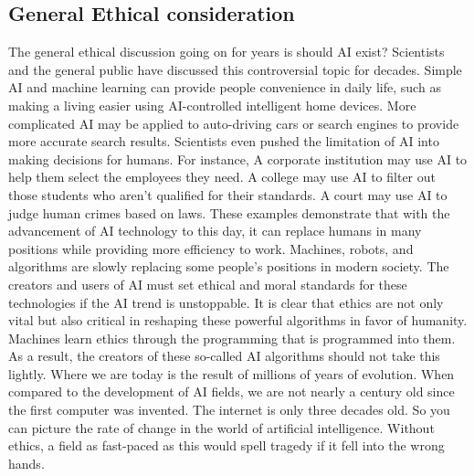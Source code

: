 \documentclass[10pt,twocolumn]{article}
\begin{document}
\subsection{General Ethical consideration}
    The general ethical discussion going on for years is should AI exist? Scientists and the general public have discussed this controversial topic for decades. Simple AI and machine learning can provide people convenience in daily life, such as making a living easier using AI-controlled intelligent home devices. More complicated AI may be applied to auto-driving cars or search engines to provide more accurate search results. Scientists even pushed the limitation of AI into making decisions for humans. For instance, A corporate institution may use AI to help them select the employees they need. A college may use AI to filter out those students who aren't qualified for their standards. A court may use AI to judge human crimes based on laws. These examples demonstrate that with the advancement of AI technology to this day, it can replace humans in many positions while providing more efficiency to work. Machines, robots, and algorithms are slowly replacing some people's positions in modern society. The creators and users of AI must set ethical and moral standards for these technologies if the AI trend is unstoppable\cite{EthicalIssue}. It is clear that ethics are not only vital but also critical in reshaping these powerful algorithms in favor of humanity. Machines learn ethics through the programming that is programmed into them. As a result, the creators of these so-called AI algorithms should not take this lightly. Where we are today is the result of millions of years of evolution. When compared to the development of AI fields, we are not nearly a century old since the first computer was invented. The internet is only three decades old. So you can picture the rate of change in the world of artificial intelligence. Without ethics, a field as fast-paced as this would spell tragedy if it fell into the wrong hands\cite{BillGates}.
    
\end{document}

